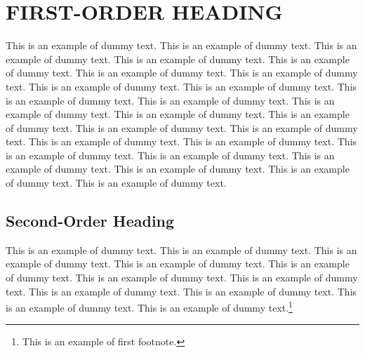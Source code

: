 \section{FIRST-ORDER HEADING}%
This is an example of dummy text. This is an example of dummy text. This is an example of dummy text. This is an example of dummy text. This is an example of dummy text. This is an example of dummy text. This is an example of dummy text. This is an example of dummy text. This is an example of dummy text. This is an example of dummy text. This is an example of dummy text. This is an example of dummy text. This is an example of dummy text. This is an example of dummy text. This is an example of dummy text. This is an example of dummy text. This is an example of dummy text. This is an example of dummy text. This is an example of dummy text. This is an example of dummy text. This is an example of dummy text. This is an example of dummy text. This is an example of dummy text. This is an example of dummy text.


\subsection{Second-Order Heading}%
This is an example of dummy text. This is an example of dummy text. This is an example of dummy text.
This is an example of dummy text. This is an example of dummy text. This is an example of dummy text.
This is an example of dummy text. This is an example of dummy text. This is an example of dummy text.
This is an example of dummy text. This is an example of dummy text.\footnote{This is an example of first footnote.}